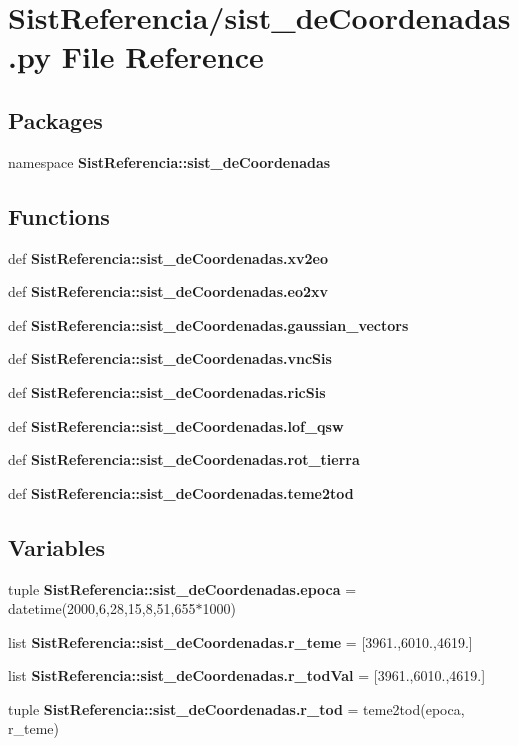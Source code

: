 \section{\-Sist\-Referencia/sist\-\_\-de\-Coordenadas.py \-File \-Reference}
\label{sist__de_coordenadas_8py}
\subsection*{\-Packages}
\begin{DoxyCompactItemize}
\item 
namespace {\bf \-Sist\-Referencia\-::sist\-\_\-de\-Coordenadas}
\end{DoxyCompactItemize}
\subsection*{\-Functions}
\begin{DoxyCompactItemize}
\item 
def {\bf \-Sist\-Referencia\-::sist\-\_\-de\-Coordenadas.\-xv2eo}
\item 
def {\bf \-Sist\-Referencia\-::sist\-\_\-de\-Coordenadas.\-eo2xv}
\item 
def {\bf \-Sist\-Referencia\-::sist\-\_\-de\-Coordenadas.\-gaussian\-\_\-vectors}
\item 
def {\bf \-Sist\-Referencia\-::sist\-\_\-de\-Coordenadas.\-vnc\-Sis}
\item 
def {\bf \-Sist\-Referencia\-::sist\-\_\-de\-Coordenadas.\-ric\-Sis}
\item 
def {\bf \-Sist\-Referencia\-::sist\-\_\-de\-Coordenadas.\-lof\-\_\-qsw}
\item 
def {\bf \-Sist\-Referencia\-::sist\-\_\-de\-Coordenadas.\-rot\-\_\-tierra}
\item 
def {\bf \-Sist\-Referencia\-::sist\-\_\-de\-Coordenadas.\-teme2tod}
\end{DoxyCompactItemize}
\subsection*{\-Variables}
\begin{DoxyCompactItemize}
\item 
tuple {\bf \-Sist\-Referencia\-::sist\-\_\-de\-Coordenadas.\-epoca} = datetime(2000,6,28,15,8,51,655$\ast$1000)
\item 
list {\bf \-Sist\-Referencia\-::sist\-\_\-de\-Coordenadas.\-r\-\_\-teme} = [3961.,6010.,4619.]
\item 
list {\bf \-Sist\-Referencia\-::sist\-\_\-de\-Coordenadas.\-r\-\_\-tod\-Val} = [3961.,6010.,4619.]
\item 
tuple {\bf \-Sist\-Referencia\-::sist\-\_\-de\-Coordenadas.\-r\-\_\-tod} = teme2tod(epoca, r\-\_\-teme)
\end{DoxyCompactItemize}
